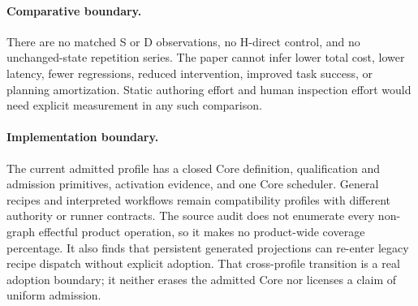 \documentclass[11pt]{article}
\begin{document}
\paragraph{Comparative boundary.}
There are no matched S or D observations, no H-direct control, and no
unchanged-state repetition series.  The paper cannot infer lower total cost,
lower latency, fewer regressions, reduced intervention, improved task success,
or planning amortization.  Static authoring effort and human inspection effort
would need explicit measurement in any such comparison.

\paragraph{Implementation boundary.}
The current admitted profile has a closed Core definition, qualification and
admission primitives, activation evidence, and one Core scheduler. General
recipes and interpreted workflows remain compatibility profiles with
different authority or runner contracts. The source audit does not enumerate
every non-graph effectful product operation, so it makes no product-wide
coverage percentage. It also finds that persistent generated projections can
re-enter legacy recipe dispatch without explicit adoption. That cross-profile
transition is a real adoption boundary; it neither erases the admitted Core
nor licenses a claim of uniform admission.
\end{document}
